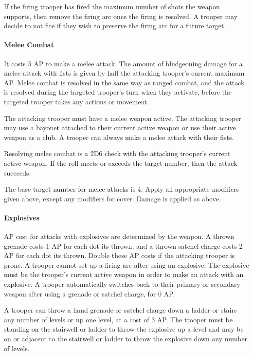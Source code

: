 If the firing trooper has fired the maximum number of shots the weapon supports, then remove the firing arc once the firing is resolved.
A trooper may decide to not fire if they wish to preserve the firing arc for a future target.

\paragraph*{Melee Combat}

It costs 5 AP to make a melee attack.
The amount of bludgeoning damage for a melee attack with fists is given by half the attacking trooper's current maximum AP.
Melee combat is resolved in the same way as ranged combat, and the attack is resolved during the targeted trooper's turn when they activate, before the targeted trooper takes any actions or movement.

The attacking trooper must have a melee weapon active.
The attacking trooper may use a bayonet attached to their current active weapon or use their active weapon as a club.
A trooper can always make a melee attack with their fists.

Resolving melee combat is a 2D6 check with the attacking trooper's current active weapon.
If the roll meets or exceeds the target number, then the attack succeeds.

The base target number for melee attacks is 4.
Apply all appropriate modifiers given above, except any modifiers for cover.
Damage is applied as above.

\paragraph*{Explosives}

AP cost for attacks with explosives are determined by the weapon.
A thrown grenade costs 1 AP for each dot its thrown, and a thrown satchel charge costs 2 AP for each dot its thrown.
Double these AP costs if the attacking trooper is prone.
A trooper cannot set up a firing arc after using an explosive.
The explosive must be the trooper's current active weapon in order to make an attack with an explosive.
A trooper automatically switches back to their primary or secondary weapon after using a grenade or satchel charge, for 0 AP.

A trooper can throw a hand grenade or satchel charge down a ladder or stairs any number of levels or up one level, at a cost of 3 AP.
The trooper must be standing on the stairwell or ladder to throw the explosive up a level and may be on or adjacent to the stairwell or ladder to throw the explosive down any number of levels.

